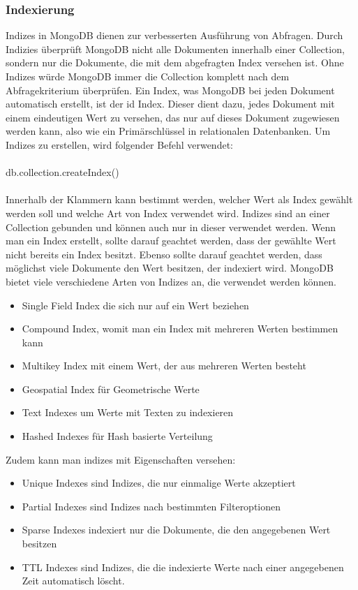 \subsubsection{Indexierung}
Indizes in MongoDB dienen zur verbesserten Ausf\"uhrung von Abfragen. Durch Indizies  \"uberpr\"uft MongoDB nicht alle Dokumenten innerhalb einer Collection, sondern nur die Dokumente, die mit dem abgefragten Index versehen ist. Ohne Indizes w\"urde MongoDB immer die Collection komplett nach dem Abfragekriterium \"uberpr\"ufen. Ein Index, was MongoDB bei jeden Dokument automatisch erstellt, ist der id Index. Dieser dient dazu, jedes Dokument mit einem eindeutigen Wert zu versehen, das nur auf dieses Dokument zugewiesen werden kann, also wie ein Prim\"arschl\"ussel in relationalen Datenbanken. Um Indizes zu erstellen, wird folgender Befehl verwendet:
\\
\\
db.collection.createIndex()
\\
\\
Innerhalb der Klammern kann bestimmt werden, welcher Wert als Index gew\"ahlt werden soll und welche Art von Index verwendet wird. Indizes sind an einer Collection gebunden und k\"onnen auch nur in dieser verwendet werden. Wenn man ein Index erstellt, sollte darauf geachtet werden, dass der gew\"ahlte Wert nicht bereits ein Index besitzt.  Ebenso sollte darauf geachtet werden, dass m\"oglichst viele Dokumente den Wert besitzen, der indexiert wird.\cite{mongo01}
MongoDB bietet viele verschiedene Arten von Indizes an, die verwendet werden k\"onnen.
\begin{itemize}
\item Single Field Index die sich nur auf ein Wert beziehen
\item Compound Index, womit man ein Index mit mehreren Werten bestimmen kann
\item Multikey Index mit einem Wert, der aus mehreren Werten besteht
\item Geospatial Index f\"ur Geometrische Werte
\item Text Indexes um Werte mit Texten zu indexieren
\item Hashed Indexes f\"ur Hash basierte Verteilung
\end{itemize}
Zudem kann man indizes mit Eigenschaften versehen:
\begin{itemize}
\item Unique Indexes sind Indizes, die nur einmalige Werte akzeptiert
\item Partial Indexes sind Indizes nach bestimmten Filteroptionen
\item Sparse Indexes indexiert nur die Dokumente, die den angegebenen Wert besitzen
\item TTL Indexes sind Indizes, die die indexierte Werte nach einer angegebenen Zeit automatisch l\"oscht.
\end{itemize}
